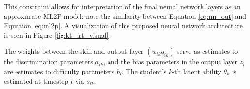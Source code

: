 This constraint allows for interpretation of the final neural network layers as an approximate ML2P model: note the similarity between Equation \ref{eq:nn_out} and Equation \ref{eq:ml2p}. A visualization of this proposed neural network architecture is seen in Figure \ref{fig:kt_irt_visual}.


The weights between the skill and output layer $(w_{ik}q_{ik})$ serve as estimates to the discrimination parameters $a_{ik}$, and the bias parameters in the output layer $z_i$ are estimates to difficulty parameters $b_i$. The student's $k$-th latent ability $\theta_k$ is estimated at timestep $t$ via $s_{tk}$.

